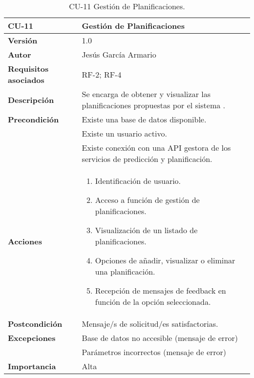 \begin{table}[p]
	\centering
	\begin{tabularx}{\linewidth}{ p{} p{} }
		\toprule
		\textbf{CU-11}    & \textbf{Gestión de Planificaciones}\\
		\toprule
		\textbf{Versión}              & 1.0    \\
		\textbf{Autor}                & Jesús García Armario \\
		\textbf{Requisitos asociados} & RF-2; RF-4 \\
		\textbf{Descripción}          & Se encarga de obtener y visualizar las planificaciones propuestas por el sistema . \\
		\textbf{Precondición}         & Existe una base de datos disponible. \\
  & Existe un usuario activo.\\
  & Existe conexión con una API gestora de los servicios de predicción y planificación.\\
		\textbf{Acciones}             &
		\begin{enumerate}
			\def\labelenumi{\arabic{enumi}.}
			\tightlist
			\item Identificación de usuario.
   \item Acceso a función de gestión de planificaciones.
   \item Visualización de un listado de planificaciones.
   \item Opciones de añadir, visualizar o eliminar una planificación.
   \item Recepción de mensajes de feedback en función de la opción seleccionada.
\end{enumerate}\\
		\textbf{Postcondición}        &  Mensaje/s de solicitud/es satisfactorias.\\
		\textbf{Excepciones}          & Base de datos no accesible (mensaje de error)\\
  & Parámetros incorrectos (mensaje de error)\\
		\textbf{Importancia}          & Alta \\
		\bottomrule
	\end{tabularx}
	\caption{CU-11 Gestión de Planificaciones.}
 \end{table}

